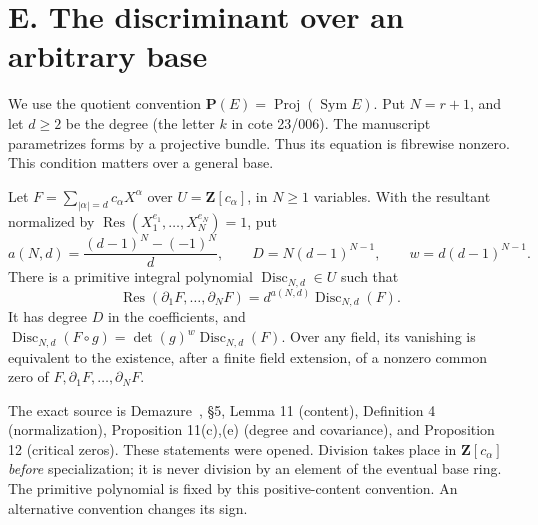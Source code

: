 \section{E. The discriminant over an arbitrary base}
\label{sec:geometry-E}

We use the quotient convention $\mathbf P(E)=\operatorname{Proj}(\operatorname{Sym}E)$.
Put $N=r+1$, and let $d\geq2$ be the degree (the letter $k$ in cote 23/006).
The manuscript parametrizes forms by a projective bundle. Thus its equation is
fibrewise nonzero. This condition matters over a general base.

\begin{theorem}\label{geo-E-normalization}
Let $F=\sum_{|\alpha|=d}c_\alpha X^\alpha$ over
$U=\mathbf Z[c_\alpha]$, in $N\geq1$ variables. With the resultant normalized by
$\operatorname{Res}(X_1^{e_1},\ldots,X_N^{e_N})=1$, put
\[
 a(N,d)=\frac{(d-1)^N-(-1)^N}{d},\qquad
 D=N(d-1)^{N-1},\qquad w=d(d-1)^{N-1}.
\]
There is a primitive integral polynomial $\operatorname{Disc}_{N,d}\in U$ such that
\[
 \operatorname{Res}(\partial_1F,\ldots,\partial_NF)
       =d^{a(N,d)}\operatorname{Disc}_{N,d}(F).
\]
It has degree $D$ in the coefficients, and
$\operatorname{Disc}_{N,d}(F\circ g)=\det(g)^w\operatorname{Disc}_{N,d}(F)$.
Over any field, its vanishing is equivalent to the existence, after a finite field
extension, of a nonzero common zero of $F,\partial_1F,\ldots,\partial_NF$.
\end{theorem}

The exact source is Demazure~\cite{Demazure2012}, \S5, Lemma 11 (content),
Definition 4 (normalization), Proposition 11(c),(e) (degree and covariance), and
Proposition 12 (critical zeros). These statements were opened. Division takes
place in $\mathbf Z[c_\alpha]$ \emph{before} specialization; it is never division
by an element of the eventual base ring. The primitive polynomial is fixed by
this positive-content convention. An alternative convention changes its sign.

